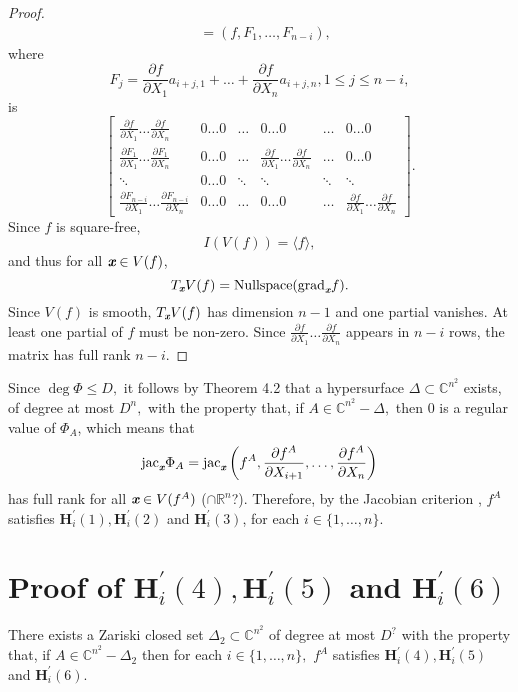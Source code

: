 \documentclass[sigconf]{acmart}
\def\xb{\textit{\textbf{x}}}
\def\C{\mathbb{C}}
\def\R{\mathbb{R}}
\def\jac{ \textrm{jac}}
\def\grad{\textrm{grad}}
\def\pa{\partial}
\begin{document}
\begin{proof}
\begin{align*}
&= (f,F_{1},\hdots,F_{n-i}),  
\end{align*} where 
\[
F_j = \frac{\pa f}{\pa X_1} a_{i+j,1} + \hdots + \frac{\pa f}{\pa X_n}a_{i+j,n}, 1 \leq j \leq n-i,\]
is
\[
\left[ 
\begin{array}{cccccc}
\frac{\pa f}{\pa X_1} \hdots \frac{\pa f}{\pa X_n}            &0\hdots 0&\hdots& 0 \hdots 0                                         & \hdots & 0\hdots 0 \\ 
\frac{\pa F_{1}}{\pa X_1}\hdots \frac{\pa F_{1}}{\pa X_n}     &0\hdots 0&\hdots& \frac{\pa f}{\pa X_1} \hdots \frac{\pa f}{\pa X_n} & \hdots & 0\hdots 0 \\
\ddots                                                        &0\hdots 0&\ddots&\ddots                                              & \ddots & \ddots \\
\frac{\pa F_{n-i}}{\pa X_1}\hdots \frac{\pa F_{n-i}}{\pa X_n} &0\hdots 0&\hdots&0 \hdots 0&  \hdots & \frac{\pa f}{\pa X_1} \hdots \frac{\pa f}{\pa X_n}  
\end{array}
\right]. 
\] 
Since $f$ is square-free, \[I(V(f)) = \langle f \rangle,\]  and thus for all $\xb \in V(f)$, 
\[
T_{\xb} V(f) = \textrm{Nullspace}(\grad_{\xb} f).
\]
Since $V(f)$ is smooth, $T_{\xb} V(f)$ has dimension $n-1$ and one partial vanishes. At least one partial of $f$ must be non-zero. Since  $\frac{\pa f}{\pa X_1} \hdots \frac{\pa f}{\pa X_n}$ appears in $n-i$ rows, the matrix has full rank $n-i$. 

\end{proof}
Since $\deg \Phi \leq D,$ it follows by Theorem 4.2 that a hypersurface $\Delta \subset \C^{n^2}$ exists, of degree at most $D^n,$ with the property that, if $A \in \C^{n^2}-\Delta,$ then $0$ is a regular value of $\Phi_{A}$, which means that 
\[
\jac_\textit{\textbf{x}} \Phi_A 
= \jac_\xb \left(f^A,\frac{\pa f^A}{\pa X_{i+1}},\hdots,\frac{\pa f^A}{\pa X_n}\right)
\] has full rank for all $\xb \in V(f^A)$ ($\cap \R^n$?). Therefore, by the Jacobian criterion \cite[Theorem 16.19]{ECA}, $f^A$ satisfies $\textbf{H}_i^{'}(1),\textbf{H}_i^{'}(2)$ and $\textbf{H}_i^{'}(3)$, for each $i \in \{1,\hdots,n\}.$
%
%
%
%
%
\section{Proof of $\textbf{H}_i^{'}(4),\textbf{H}_i^{'}(5)$ and $\textbf{H}_i^{'}(6)$}
%
\begin{theorem}
There exists a Zariski closed set $\Delta_2 \subset \C^{n^2}$ of degree at most $D^{\textrm{?}}$ with the property that, if $A \in \C^{n^2} - \Delta_2$ then for each $i \in \{1,\hdots,n\},$ $f^A$ satisfies $\textbf{H}_i^{'}(4),\textbf{H}_i^{'}(5)$ and $\textbf{H}_i^{'}(6)$.
\end{theorem}
%
\end{document}
